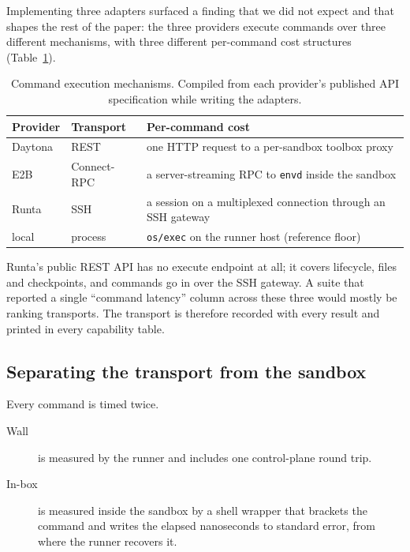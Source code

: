 Implementing three adapters surfaced a finding that we did not expect and that
shapes the rest of the paper: the three providers execute commands over three
different mechanisms, with three different per-command cost structures
(Table~\ref{tab:transports}).

\begin{table}[t]
\caption{Command execution mechanisms. Compiled from each provider's published
API specification while writing the adapters.}
\label{tab:transports}
\small
\begin{tabular}{@{}llp{3.4cm}@{}}
\toprule
Provider & Transport & Per-command cost \\
\midrule
Daytona & REST            & one HTTP request to a per-sandbox toolbox proxy \\
E2B     & Connect-RPC     & a server-streaming RPC to \texttt{envd} inside the sandbox \\
Runta   & SSH             & a session on a multiplexed connection through an SSH gateway \\
\midrule
local   & process         & \texttt{os/exec} on the runner host (reference floor) \\
\bottomrule
\end{tabular}
\end{table}

Runta's public REST API has no execute endpoint at all; it covers lifecycle,
files and checkpoints, and commands go in over the SSH gateway. A suite that
reported a single ``command latency'' column across these three would mostly be
ranking transports. The transport is therefore recorded with every result and
printed in every capability table.

\subsection{Separating the transport from the sandbox}
\label{sec:impl:timing}

Every command is timed twice.

\begin{description}
  \item[Wall] is measured by the runner and includes one control-plane round
  trip.
  \item[In-box] is measured inside the sandbox by a shell wrapper that
  brackets the command and writes the elapsed nanoseconds to standard error,
  from where the runner recovers it.
\end{description}

